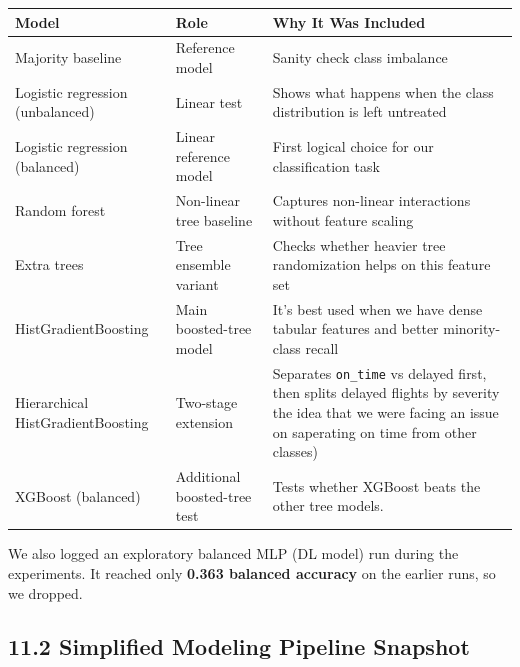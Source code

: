 \documentclass{article}
\newcommand{\code}[1]{\texttt{\small #1}}
\begin{document}
\begin{tcolorbox}[mainbox, title={Candidate Models Used in the Locked Final Comparison}]
\renewcommand{\arraystretch}{1.35}
\small
\begin{tabularx}{\textwidth}{L{3.6cm} L{3.2cm} X}
    \toprule
    \textbf{Model} & \textbf{Role} & \textbf{Why It Was Included} \\
    \midrule
    Majority baseline & Reference model & Sanity check class imbalance \\
    Logistic regression (unbalanced) & Linear test & Shows what happens when the class distribution is left untreated \\
    Logistic regression (balanced) & Linear reference model & First logical choice for our classification task \\
    Random forest & Non-linear tree baseline & Captures non-linear interactions without feature scaling \\
    Extra trees & Tree ensemble variant & Checks whether heavier tree randomization helps on this feature set \\
    HistGradientBoosting & Main boosted-tree model & It's best used when we have dense tabular features and better minority-class recall  \\
    Hierarchical HistGradientBoosting & Two-stage extension & Separates \code{on\_time} vs delayed first, then splits delayed flights by severity the idea that we were facing an issue on saperating on time from other classes) \\
    XGBoost (balanced) & Additional boosted-tree test & Tests whether XGBoost beats the other tree models. \\
    \bottomrule
\end{tabularx}
\end{tcolorbox}

We also logged an exploratory balanced MLP (DL model) run during the experiments. It reached only \textbf{0.363 balanced accuracy} on the earlier runs, so we dropped.

\subsection*{\textcolor{accentgold}{11.2 Simplified Modeling Pipeline Snapshot}}
\end{document}
